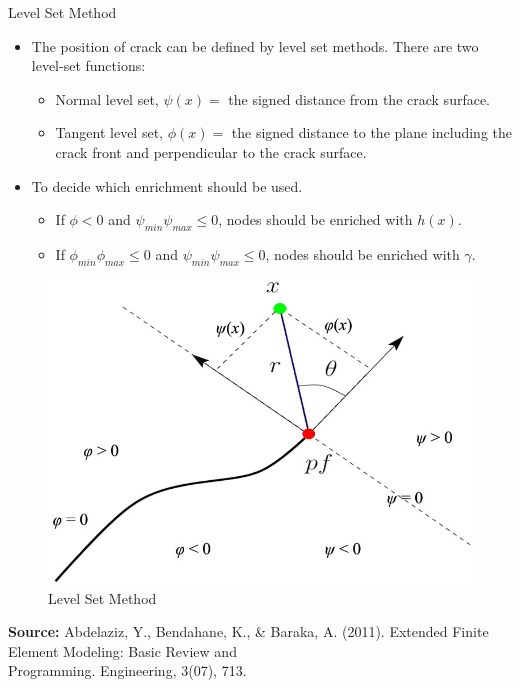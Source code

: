 \documentclass{beamer}
\begin{document}
\begin{frame}[t,fragile]{Level Set Method}
    \vspace{-.3cm}
    \footnotesize
    \begin{itemize}
        \item The position of crack can be defined by level set methods. There are two level-set functions:
          \begin{itemize}
        \item Normal level set, $\psi(x)=$ the signed distance from the crack surface.
        \item Tangent level set, $\phi(x)=$ the signed distance to the plane including the crack front and perpendicular to the crack surface.
        \end{itemize}
    \item To decide which enrichment should be used. 
        \begin{itemize}
            \item If $\phi < 0 $ and $\psi_{min}\psi_{max}\leq 0$, nodes should be enriched with $h(x)$.
            \item If $\phi_{min}\phi_{max}\leq 0$ and $\psi_{min}\psi_{max}\leq 0 $, nodes should be enriched with $\gamma$.
        \end{itemize}
    \end{itemize}
  \begin{figure}
                \centering
                \vspace{-15pt}
                \includegraphics[scale=.15]{levelset.jpg}
                \caption{\tiny Level Set Method}
                \label{4}
            \end{figure}
    \tiny 
    \vspace{-20pt}
  \hspace{10pt}
    \textbf{Source:} Abdelaziz, Y., Bendahane, K., \& Baraka, A. (2011). Extended Finite Element Modeling: Basic Review and\\
  \vspace{-1pt}
  \hspace{10pt}
    Programming. Engineering, 3(07), 713.

\end{frame}
\end{document}
